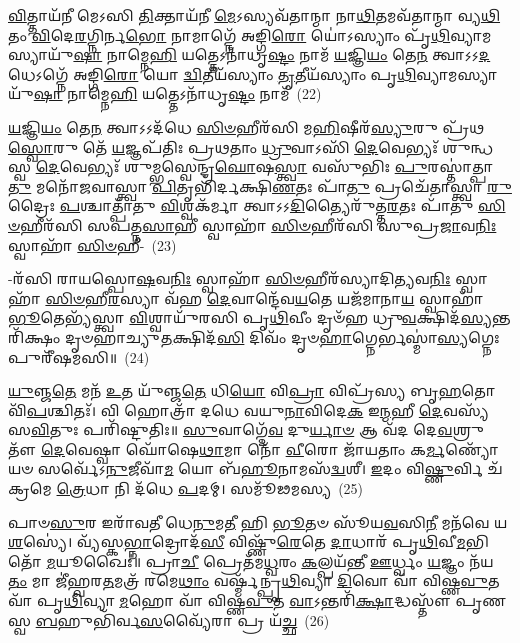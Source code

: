 \-\ul{𑌵𑌿}\-𑌤𑍍𑌤𑌾𑌯᳴𑌨𑍀 𑌮𑍇\-𑌽𑌸𑌿 \ul{𑌤𑌿}\-𑌕𑍍𑌤𑌾𑌯᳴𑌨𑍀 \ul{𑌮𑍇}\-\-𑌽𑌸𑍍𑌯𑌵᳴𑌤𑌾𑌨𑍍𑌮𑌾 𑌨𑌾\-\ul{𑌥𑌿}\-𑌤𑌮𑌵᳴𑌤𑌾𑌨𑍍𑌮𑌾 𑌵𑍍𑌯\-\ul{𑌥𑌿}\-𑌤𑌂 \ul{𑌵𑌿}\-𑌦𑍇\-\ul{𑌰}\-𑌗𑍍𑌨𑌿𑌰𑍍𑌨\-\ul{𑌭𑍋} 𑌨𑌾𑌮𑌾𑌗𑍍𑌨𑍇᳴ 𑌅𑌙𑍍𑌗𑌿\-\ul{𑌰𑍋} 𑌯𑍋॑\-𑌽𑌸𑍍𑌯𑌾𑌂 𑌪𑍃᳴\-\ul{𑌥𑌿}\-𑌵𑍍𑌯𑌾𑌮𑌸𑍍𑌯𑌾𑌯𑍁᳴\-\ul{𑌷𑌾} 𑌨𑌾𑌮𑍍𑌨𑍇\-\ul{𑌹𑌿} 𑌯𑌤𑍍𑌤𑍇\-𑌽𑌨𑌾᳴𑌧𑍃\-\ul{𑌷𑍍𑌟𑌂} 𑌨𑌾𑌮᳴ \ul{𑌯}\-𑌜𑍍𑌞𑌿\-\ul{𑌯𑌂} 𑌤𑍇\-\ul{𑌨} 𑌤𑍍𑌵𑌾\-𑌽\-𑌽\-\ul{𑌦}\-𑌧𑍇\-𑌽𑌗𑍍𑌨𑍇᳴ 𑌅𑌙𑍍𑌗𑌿\-\ul{𑌰𑍋} 𑌯𑍋 \ul{𑌦𑍍𑌵𑌿}\-𑌤𑍀𑌯᳴𑌸𑍍𑌯𑌾𑌂 \ul{𑌤𑍃}\-𑌤𑍀𑌯᳴𑌸𑍍𑌯𑌾𑌂 𑌪𑍃\-\ul{𑌥𑌿}\-𑌵𑍍𑌯𑌾𑌮𑌸𑍍𑌯𑌾𑌯𑍁᳴\-\ul{𑌷𑌾} 𑌨𑌾𑌮𑍍𑌨𑍇\-\ul{𑌹𑌿} 𑌯𑌤𑍍𑌤𑍇\-𑌽𑌨𑌾᳴𑌧𑍃\-\ul{𑌷𑍍𑌟𑌂} 𑌨𑌾𑌮᳴~(22)

\-\ul{𑌯}\-𑌜𑍍𑌞𑌿\-\ul{𑌯𑌂} 𑌤𑍇\-\ul{𑌨} 𑌤𑍍𑌵𑌾\-𑌽\-𑌽𑌦᳴𑌧𑍇 \ul{𑌸𑌿}\-\-\ul{𑍞}\-𑌹𑍀𑌰᳴𑌸𑌿 𑌮\-\ul{𑌹𑌿}\-𑌷𑍀𑌰᳴\-\ul{𑌸𑍍𑌯𑍁}\-𑌰𑍁 𑌪𑍍𑌰᳴𑌥\-\ul{𑌸𑍍𑌵𑍋}\-𑌰𑍁 𑌤𑍇᳴ \ul{𑌯}\-𑌜𑍍𑌞𑌪᳴𑌤𑌿𑌃 𑌪𑍍𑌰𑌥𑌤𑌾𑌂 \ul{𑌧𑍍𑌰𑍁}\-𑌵𑌾\-𑌽𑌸𑌿᳴ \ul{𑌦𑍇}\-𑌵𑍇𑌭𑍍𑌯𑌃᳴ 𑌶𑍁𑌨𑍍𑌧𑌸𑍍𑌵 \ul{𑌦𑍇}\-𑌵𑍇𑌭𑍍𑌯𑌃᳴ 𑌶𑍁𑌮𑍍𑌭𑌸𑍍𑌵𑍇𑌨𑍍𑌦𑍍𑌰\-\ul{𑌘𑍋}\-𑌷\-\ul{𑌸𑍍𑌤𑍍𑌵𑌾} 𑌵𑌸𑍁᳴𑌭𑌿𑌃 \ul{𑌪𑍁}\-𑌰𑌸𑍍𑌤𑌾॑𑌤𑍍𑌪𑌾\-\ul{𑌤𑍁} 𑌮𑌨𑍋᳴𑌜𑌵𑌾𑌸𑍍𑌤𑍍𑌵𑌾 \ul{𑌪𑌿}\-𑌤𑍃𑌭𑌿᳴𑌰𑍍𑌦𑌕𑍍𑌷𑌿\-\ul{𑌣}\-𑌤𑌃 𑌪𑌾᳴\-\ul{𑌤𑍁} 𑌪𑍍𑌰𑌚𑍇᳴𑌤𑌾𑌸𑍍𑌤𑍍𑌵𑌾 \ul{𑌰𑍁}\-𑌦𑍍𑌰𑍈𑌃 \ul{𑌪}\-𑌶𑍍𑌚𑌾𑌤𑍍𑌪𑌾᳴𑌤𑍁 \ul{𑌵𑌿}\-𑌶𑍍𑌵𑌕᳴𑌰𑍍𑌮𑌾 𑌤𑍍𑌵𑌾\-𑌽\-𑌽\-\ul{𑌦𑌿}\-𑌤𑍍𑌯𑍈𑌰𑍁᳴𑌤𑍍𑌤\-\ul{𑌰}\-𑌤𑌃 𑌪𑌾᳴𑌤𑍁 \ul{𑌸𑌿}\-\-\ul{𑍞}\-𑌹𑍀𑌰᳴𑌸𑌿 𑌸𑌪𑌤𑍍𑌨\-\ul{𑌸𑌾}\-𑌹𑍀 𑌸𑍍𑌵𑌾𑌹𑌾᳴ \ul{𑌸𑌿}\-\-\ul{𑍞}\-𑌹𑍀𑌰᳴𑌸𑌿 𑌸𑍁𑌪𑍍𑌰\-\ul{𑌜𑌾}\-𑌵\-\ul{𑌨𑌿𑌃} 𑌸𑍍𑌵𑌾𑌹𑌾᳴ \ul{𑌸𑌿}\-\-\ul{𑍞}\-𑌹𑍀-~(23)

-𑌰᳴𑌸𑌿 𑌰𑌾𑌯𑌸𑍍𑌪𑍋\-\ul{𑌷}\-𑌵\-\ul{𑌨𑌿𑌃} 𑌸𑍍𑌵𑌾𑌹𑌾᳴ \ul{𑌸𑌿}\-\-\ul{𑍞}\-𑌹𑍀𑌰᳴𑌸𑍍𑌯𑌾𑌦𑌿\-\ul{𑌤𑍍𑌯}\-𑌵\-\ul{𑌨𑌿𑌃} 𑌸𑍍𑌵𑌾𑌹𑌾᳴ \ul{𑌸𑌿}\-\-\ul{𑍞}\-𑌹𑍀\-\ul{𑌰}\-𑌸𑍍𑌯𑌾 𑌵᳴𑌹 \ul{𑌦𑍇}\-𑌵𑌾𑌨𑍍𑌦𑍇᳴𑌵\-\ul{𑌯}\-𑌤𑍇 𑌯𑌜᳴𑌮𑌾𑌨𑌾\-\ul{𑌯} 𑌸𑍍𑌵𑌾𑌹𑌾᳴ \ul{𑌭𑍂}\-𑌤𑍇𑌭𑍍𑌯᳴𑌸𑍍𑌤𑍍𑌵𑌾 \ul{𑌵𑌿}\-𑌶𑍍𑌵𑌾𑌯𑍁᳴𑌰𑌸𑌿 𑌪𑍃\-\ul{𑌥𑌿}\-𑌵𑍀𑌂 𑌦𑍃𑍞᳴𑌹 𑌧𑍍𑌰𑍁\-\ul{𑌵}\-𑌕𑍍𑌷𑌿𑌦᳴\-\ul{𑌸𑍍𑌯}\-𑌨𑍍𑌤𑌰𑌿᳴𑌕𑍍𑌷𑌂 𑌦𑍃𑍞𑌹𑌾𑌚𑍍𑌯𑍁\-\ul{𑌤}\-𑌕𑍍𑌷𑌿𑌦᳴\-\ul{𑌸𑌿} 𑌦𑌿𑌵𑌂᳴ 𑌦𑍃𑍞\-\ul{𑌹𑌾}\-𑌗𑍍𑌨𑍇𑌰𑍍𑌭𑌸𑍍𑌮𑌾॑\-\ul{𑌸𑍍𑌯}\-𑌗𑍍𑌨𑍇𑌃 𑌪𑍁𑌰𑍀᳴𑌷𑌮𑌸𑌿॥~(24)

{\anuvakamend[{𑌨𑌾𑌮᳴ 𑌸𑍁𑌪𑍍𑌰\-\ul{𑌜𑌾}\-𑌵\-\ul{𑌨𑌿𑌃} 𑌸𑍍𑌵𑌾𑌹𑌾᳴ \ul{𑌸𑌿}\-\-\ul{𑍞}\-𑌹𑍀𑌃 𑌪𑌞𑍍𑌚᳴𑌤𑍍𑌰𑌿𑍞𑌶𑌚𑍍𑌚}]}%

\-\ul{𑌯𑍁}\-𑌞𑍍𑌜\-\ul{𑌤𑍇} 𑌮𑌨᳴ \ul{𑌉}\-𑌤 𑌯𑍁᳴𑌞𑍍𑌜\-\ul{𑌤𑍇} 𑌧𑌿\-\ul{𑌯𑍋} 𑌵𑌿\-\ul{𑌪𑍍𑌰𑌾} 𑌵𑌿𑌪𑍍𑌰᳴𑌸𑍍𑌯 𑌬𑍃\-\ul{𑌹}\-𑌤𑍋 𑌵𑌿᳴\-\ul{𑌪}\-𑌶𑍍𑌚𑌿𑌤𑌃᳴। 𑌵𑌿 𑌹𑍋𑌤𑍍𑌰𑌾᳴ 𑌦𑌧𑍇 𑌵𑌯𑍁\-\ul{𑌨𑌾}\-𑌵𑌿𑌦𑍇\-\ul{𑌕} 𑌇\-\ul{𑌨𑍍𑌮}\-𑌹𑍀 \ul{𑌦𑍇}\-𑌵𑌸𑍍𑌯᳴ 𑌸\-\ul{𑌵𑌿}\-𑌤𑍁𑌃 𑌪𑌰𑌿᳴𑌷𑍍𑌟𑍁𑌤𑌿𑌃॥ \ul{𑌸𑍁}\-𑌵𑌾𑌗𑍍𑌦𑍇᳴\-\ul{𑌵} 𑌦𑍁\-\ul{𑌰𑍍𑌯𑌾}\-\-\ul{𑍞} 𑌆 𑌵᳴𑌦 𑌦𑍇\-\ul{𑌵}\-𑌶𑍍𑌰𑍁𑌤𑍗᳴ \ul{𑌦𑍇}\-𑌵𑍇𑌷𑍍𑌵𑌾 𑌘𑍋᳴𑌷𑍇\-\ul{𑌥𑌾}\-𑌮𑌾 𑌨𑍋᳴ \ul{𑌵𑍀}\-𑌰𑍋 𑌜𑌾᳴𑌯𑌤𑌾𑌂 𑌕\-\ul{𑌰𑍍𑌮}\-𑌣𑍍𑌯𑍋᳴ 𑌯𑍞 𑌸𑌰𑍍𑌵𑍇᳴\-𑌽\-\ul{𑌨𑍁}\-𑌜𑍀𑌵𑌾᳴\-\ul{𑌮} 𑌯𑍋 𑌬᳴\-\ul{𑌹𑍂}\-𑌨𑌾𑌮𑌸᳴\-\ul{𑌦𑍍𑌵}\-𑌶𑍀। \ul{𑌇}\-𑌦𑌂 𑌵𑌿\-\ul{𑌷𑍍𑌣𑍁}\-𑌰𑍍𑌵𑌿 𑌚᳴𑌕𑍍𑌰𑌮𑍇 \ul{𑌤𑍍𑌰𑍇}\-𑌧𑌾 𑌨𑌿 𑌦᳴𑌧𑍇 \ul{𑌪}\-𑌦𑌮𑍍। 𑌸𑌮𑍂᳴𑌢𑌮𑌸𑍍𑌯~(25)

𑌪𑌾𑍞\-\ul{𑌸𑍁}\-𑌰 𑌇𑌰𑌾᳴𑌵𑌤𑍀 𑌧𑍇\-\ul{𑌨𑍁}\-𑌮\-\ul{𑌤𑍀} 𑌹𑌿 \ul{𑌭𑍂}\-𑌤𑍞 𑌸𑍂᳴𑌯\-\ul{𑌵}\-𑌸𑌿\-\ul{𑌨𑍀} 𑌮𑌨᳴𑌵𑍇 𑌯\-\ul{𑌶}\-𑌸𑍍𑌯𑍇॑। 𑌵𑍍𑌯᳴𑌸𑍍𑌕\-\ul{𑌭𑍍𑌨𑌾}\-𑌦𑍍𑌰𑍋𑌦᳴\-\ul{𑌸𑍀} 𑌵𑌿𑌷𑍍𑌣𑍁᳴\-\ul{𑌰𑍇}\-𑌤𑍇 \ul{𑌦𑌾}\-𑌧𑌾𑌰᳴ 𑌪𑍃\-\ul{𑌥𑌿}\-𑌵𑍀\-\ul{𑌮}\-𑌭𑌿𑌤𑍋᳴ \ul{𑌮}\-𑌯𑍂𑌖𑍈𑌃॑॥ 𑌪𑍍𑌰𑌾\-\ul{𑌚𑍀} 𑌪𑍍𑌰𑍇𑌤᳴𑌮\-\ul{𑌧𑍍𑌵}\-𑌰𑌂 \ul{𑌕}\-𑌲𑍍𑌪𑌯᳴𑌨𑍍𑌤𑍀 \ul{𑌊}\-𑌰𑍍𑌧𑍍𑌵𑌂 \ul{𑌯}\-𑌜𑍍𑌞𑌂 𑌨᳴𑌯\-\ul{𑌤𑌂} 𑌮𑌾 𑌜𑍀॑𑌹𑍍𑌵𑌰\-\ul{𑌤}\-𑌮𑌤𑍍𑌰᳴ 𑌰𑌮𑍇\-\ul{𑌥𑌾𑌂} 𑌵𑌰𑍍𑌷𑍍𑌮᳴𑌨𑍍𑌪𑍃\-\ul{𑌥𑌿}\-𑌵𑍍𑌯𑌾 \ul{𑌦𑌿}\-𑌵𑍋 𑌵𑌾᳴ 𑌵𑌿𑌷𑍍𑌣\-\ul{𑌵𑍁}\-𑌤 𑌵𑌾᳴ 𑌪𑍃\-\ul{𑌥𑌿}\-𑌵𑍍𑌯𑌾 \ul{𑌮}\-𑌹𑍋 𑌵𑌾᳴ 𑌵𑌿𑌷𑍍𑌣\-\ul{𑌵𑍁}\-𑌤 \ul{𑌵𑌾}\-\-𑌽𑌨𑍍𑌤𑌰𑌿᳴\-\ul{𑌕𑍍𑌷𑌾}\-𑌦𑍍𑌧𑌸𑍍𑌤𑍗᳴ 𑌪𑍃𑌣𑌸𑍍𑌵 \ul{𑌬}\-𑌹𑍁𑌭𑌿᳴𑌰𑍍𑌵\-\ul{𑌸}\-𑌵𑍍𑌯𑍈᳴𑌰𑌾 𑌪𑍍𑌰 𑌯᳴\-\ul{𑌚𑍍𑌛}\-~(26)

